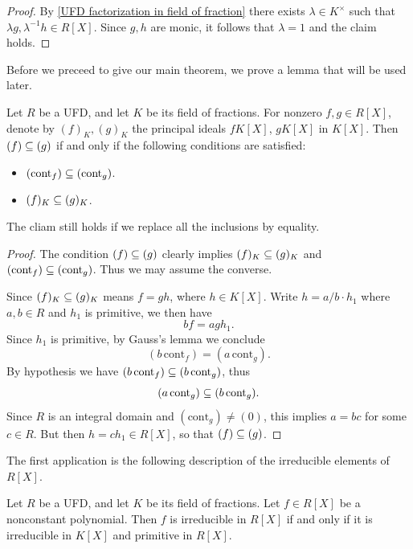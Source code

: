 \begin{proof}
By \cref{UFD factorization in field of fraction} there exists $\lambda\in K^\times$ such that $\lambda g,\lambda^{-1}h\in R[X]$. Since $g,h$ are monic, it follows that $\lambda=1$ and the claim holds.
\end{proof}
Before we preceed to give our main theorem, we prove a lemma that will be used later.
\begin{lemma}\label{UFD inclusion of principal polynomial ideals iff}
Let $R$ be a UFD, and let $K$ be its field of fractions. For nonzero $f,g\in R[X]$, denote by $(f)_K,(g)_K$ the principal ideals $fK[X]$, $gK[X]$ in $K[X]$. Then $(f)\subseteq(g)$ if and only if the following conditions are satisfied:
\begin{itemize}
\item $(\mathrm{cont}_f)\subseteq(\mathrm{cont}_g)$.
\item $(f)_K\subseteq (g)_K$.
\end{itemize}
The cliam still holds if we replace all the inclusions by equality.
\end{lemma}
\begin{proof}
The condition $(f)\subseteq(g)$ clearly implies $(f)_K\subseteq(g)_K$ and $(\mathrm{cont}_f)\subseteq(\mathrm{cont}_g)$. Thus we may assume the converse.\par
Since $(f)_K\subseteq (g)_K$ means $f=gh$, where $h\in K[X]$. Write $h=a/b\cdot h_1$ where $a,b\in R$ and $h_1$ is primitive, we then have
\[bf=agh_1.\]
Since $h_1$ is primitive, by Gauss's lemma we conclude
\[(b\,\mathrm{cont}_f)=(a\,\mathrm{cont}_g).\]
By hypothesis we have $(b\,\mathrm{cont}_f)\subseteq(b\,\mathrm{cont}_g)$, thus
\[(a\,\mathrm{cont}_g)\subseteq(b\,\mathrm{cont}_g).\]
Since $R$ is an integral domain and $(\mathrm{cont}_g)\neq(0)$, this implies $a=bc$ for some $c\in R$. But then $h=ch_1\in R[X]$, so that $(f)\subseteq(g)$. 
\end{proof}
The first application is the following description of the irreducible elements
of $R[X]$.
\begin{proposition}\label{UFD irreducible in field of fraction iff}
Let $R$ be a UFD, and let $K$ be its field of fractions. Let $f\in R[X]$ be a nonconstant polynomial. Then $f$ is irreducible in $R[X]$ if and only if it is irreducible in $K[X]$ and primitive in $R[X]$.
\end{proposition}
